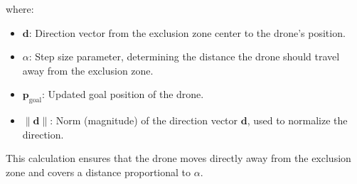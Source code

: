 where:
\begin{itemize}
    \item \(\mathbf{d}\): Direction vector from the exclusion 
    zone center to the drone's position.
    \item \(\alpha\): Step size parameter, determining the 
    distance the drone should travel away from the exclusion zone.
    \item \(\mathbf{p}_{\text{goal}}\): Updated goal position of the drone.
    \item \(\|\mathbf{d}\|\): Norm (magnitude) of the direction 
    vector \(\mathbf{d}\), used to normalize the direction.
\end{itemize}
This calculation ensures that the drone moves directly away 
from the exclusion zone and covers a distance proportional 
to \(\alpha\). 
\\

